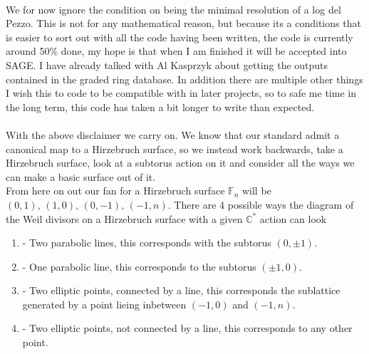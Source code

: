 \documentclass[11pt]{report}
\theoremstyle{definition}
\theoremstyle{definition}
\theoremstyle{definition}
\theoremstyle{definition}
\theoremstyle{definition}
\theoremstyle{definition}
\theoremstyle{definition}
\begin{document}
\\
We for now ignore the condition on being the minimal resolution of a log del Pezzo. This is not for any mathematical reason, but because its a conditions that is easier to sort out with all the code having been written, the code is currently around 50\% done, my hope is that when I am finished it will be accepted into SAGE. I have already talked with Al Kasprzyk about getting the outputs contained in the graded ring database. In addition there are multiple other things I wish this to code to be compatible with in later projects, so to safe me time in the long term, this code has taken a bit longer to write than expected.
\\
\\
With the above disclaimer we carry on. We know that our standard admit a canonical map to a Hirzebruch surface, so we instead work backwards, take a Hirzebruch surface, look at a subtorus action on it and consider all the ways we can make a basic surface out of it.
\\
From here on out our fan for a Hirzebruch surface $\mathbb{F}_n$ will be $(0,1), \, (1,0), \, (0,-1), \, (-1, n)$. There are 4 possible ways the diagram of the Weil divisors on a Hirzebruch surface with a given $\mathbb{C}^*$ action can look
\begin{enumerate}[label =\Alph*]
\item - Two parabolic lines, this corresponds with the subtorus $(0, \pm 1)$.
\item - One parabolic line, this corresponds to the subtorus $(\pm 1, 0)$.
\item - Two elliptic points, connected by a line, this corresponds the sublattice generated by a point lieing inbetween $(-1,0)$ and $(-1, n)$.
\item - Two elliptic points, not connected by a line, this corresponds to any other point.
\end{enumerate} 
\end{document}
